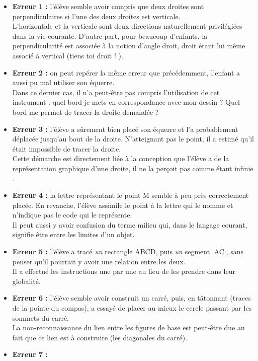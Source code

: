 \begin{itemize}
   \item {\bf Erreur 1 :} l'élève semble avoir compris que deux droites sont perpendiculaires si l'une des deux droites est verticale. \\
   L'horizontale et la verticale sont deux directions naturellement privilégiées dans la vie courante. D'autre part, pour beaucoup d'enfants, la perpendicularité est associée à la notion d'angle droit, droit étant lui même associé à vertical (\og tiens toi droit ! \fg).
   \item {\bf Erreur 2 :} on peut repérer la même erreur que précédemment, l'enfant a aussi pu mal utiliser son équerre. \\
   Dans ce dernier cas, il n'a peut-être pas compris l'utilisation de cet instrument : quel \og bord \fg{} je mets en correspondance avec mon dessin ? Quel \og bord \fg{} me permet de tracer la droite demandée ?
   \item {\bf Erreur 3 :} l'élève a sûrement bien placé son équerre et l'a probablement déplacée jusqu'au \og bout \fg{} de la droite. N'atteignant pas le point, il a estimé qu'il était impossible de tracer la droite. \\
   Cette démarche est directement liée à la conception que l'élève a de la représentation graphique d'une droite, il ne la perçoit pas comme étant \og infinie \fg.
   \item {\bf Erreur 4 :} la lettre représentant le point M semble à peu près correctement placée. En revanche, l'élève assimile le point à la lettre qui le nomme et n'indique pas le code qui le représente. \\
   Il peut aussi y avoir confusion du terme \og milieu \fg{} qui, dans le langage courant, signifie être entre les limites d'un objet.
   \item {\bf Erreur 5 :} l'élève a tracé {\it un} rectangle ABCD, puis {\it un} segment [AC], sans penser qu'il pourrait y avoir une relation entre les deux. \\
   Il a effectué les instructions une par une au lieu de les prendre dans leur globalité.
   \item {\bf Erreur 6 :} l'élève semble avoir construit un carré, puis, en tâtonnant (traces de la pointe du compas), a essayé de placer au mieux le cercle passant par les sommets du carré. \\
   La non-reconnaissance du lien entre les figures de base est peut-être due au fait que ce lien est à construire (les diagonales du carré).
   \item {\bf Erreur 7 :} \\

\end{itemize}
